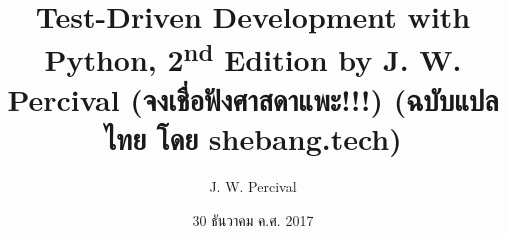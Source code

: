\documentclass[a4paper]{book}
\begin{document}
  \frontmatter
  \title{Test-Driven Development with Python, 2\textsuperscript{nd} Edition by
  J. W. Percival (จงเชื่อฟังศาสดาแพะ!!!) (ฉบับแปลไทย โดย shebang.tech)}

  \author{J. W. Percival}

  \date{30 ธันวาคม ค.ศ. 2017}

  \maketitle

  \tableofcontents
  \listoffigures
  \listoftables

  \mainmatter

  \backmatter
  \listoftodos
\end{document}

